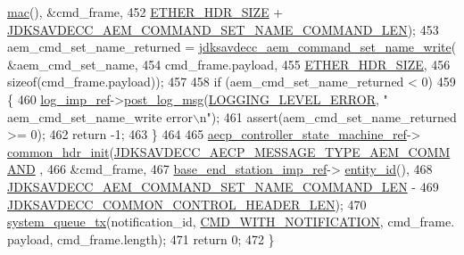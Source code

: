 \begin{DoxyCode}
      \hyperlink{classavdecc__lib_1_1end__station__imp_a08e1bd1861b3b8f447ea374a65ac11f9}{mac}(), &cmd\_frame,
452                                                         \hyperlink{namespaceavdecc__lib_a6c827b1a0d973e18119c5e3da518e65ca9512ad9b34302ba7048d88197e0a2dc0}{ETHER\_HDR\_SIZE} + 
      \hyperlink{group__command__set__name_ga133a28cbd2bc0e77c69d8135f36324f6}{JDKSAVDECC\_AEM\_COMMAND\_SET\_NAME\_COMMAND\_LEN});
453     aem\_cmd\_set\_name\_returned = \hyperlink{group__command__set__name_ga42e5da3685796fb973c5824f960eed2e}{jdksavdecc\_aem\_command\_set\_name\_write}(
      &aem\_cmd\_set\_name,
454                                                                       cmd\_frame.payload,
455                                                                       
      \hyperlink{namespaceavdecc__lib_a6c827b1a0d973e18119c5e3da518e65ca9512ad9b34302ba7048d88197e0a2dc0}{ETHER\_HDR\_SIZE},
456                                                                       \textcolor{keyword}{sizeof}(cmd\_frame.payload));
457 
458     \textcolor{keywordflow}{if} (aem\_cmd\_set\_name\_returned < 0)
459     \{
460         \hyperlink{namespaceavdecc__lib_acbe3e2a96ae6524943ca532c87a28529}{log\_imp\_ref}->\hyperlink{classavdecc__lib_1_1log_a68139a6297697e4ccebf36ccfd02e44a}{post\_log\_msg}(\hyperlink{namespaceavdecc__lib_a501055c431e6872ef46f252ad13f85cdaf2c4481208273451a6f5c7bb9770ec8a}{LOGGING\_LEVEL\_ERROR}, \textcolor{stringliteral}{"
      aem\_cmd\_set\_name\_write error\(\backslash\)n"});
461         assert(aem\_cmd\_set\_name\_returned >= 0);
462         \textcolor{keywordflow}{return} -1;
463     \}
464 
465     \hyperlink{namespaceavdecc__lib_a0b1b5aea3c0490f77cbfd9178af5be22}{aecp\_controller\_state\_machine\_ref}->
      \hyperlink{classavdecc__lib_1_1aecp__controller__state__machine_aafc737d7ed17a62fed9df6528f18d3ec}{common\_hdr\_init}(\hyperlink{group__aecp__message__type_ga4625ce189cc209f42deb0629f48faf69}{JDKSAVDECC\_AECP\_MESSAGE\_TYPE\_AEM\_COMMAND}
      ,
466                                                        &cmd\_frame,
467                                                        \hyperlink{classavdecc__lib_1_1descriptor__base__imp_a550c969411f5f3b69f55cc139763d224}{base\_end\_station\_imp\_ref}->
      \hyperlink{classavdecc__lib_1_1end__station__imp_a363b6c9664a0d701def9b17863e20ad3}{entity\_id}(),
468                                                        
      \hyperlink{group__command__set__name_ga133a28cbd2bc0e77c69d8135f36324f6}{JDKSAVDECC\_AEM\_COMMAND\_SET\_NAME\_COMMAND\_LEN} -
469                                                            
      \hyperlink{group__jdksavdecc__avtp__common__control__header_gaae84052886fb1bb42f3bc5f85b741dff}{JDKSAVDECC\_COMMON\_CONTROL\_HEADER\_LEN});
470     \hyperlink{namespaceavdecc__lib_a6dd511685627c0865a3442b539a4e8e9}{system\_queue\_tx}(notification\_id, \hyperlink{namespaceavdecc__lib_aabcadff06aa62be0ce47bc0646823604aba48b8a017e06fb240b650cdea965178}{CMD\_WITH\_NOTIFICATION}, cmd\_frame.
      payload, cmd\_frame.length);
471     \textcolor{keywordflow}{return} 0;
472 \}
\end{DoxyCode}


